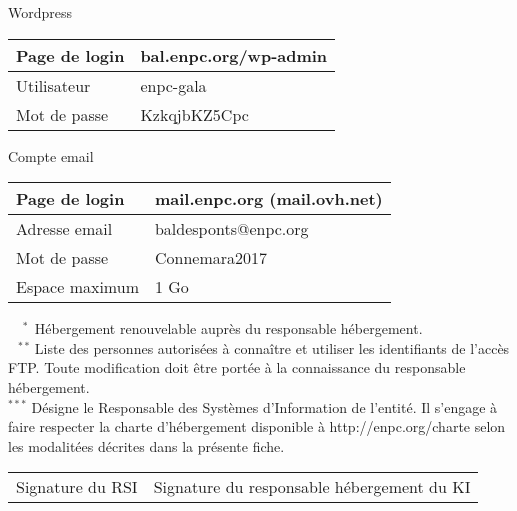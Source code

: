 \documentclass{ki019}
\newenvironment{tableau}[1]{
\LARGE #1\\
\vspace{0.4cm}
\begin{tabular}{|K{5cm}|K{10cm}|}
}
{
\end{tabular}
\vspace{0.5cm}
}
\begin{document}
\begin{center}
\begin{tableau}{Wordpress}
\hline
Page de login & bal.enpc.org/wp-admin \\
\hline
Utilisateur & enpc-gala \\
\hline
Mot de passe & KzkqjbKZ5Cpc \\
\hline
\end{tableau}

\begin{tableau}{Compte email}
\hline
Page de login & mail.enpc.org (mail.ovh.net) \\
\hline
Adresse email & baldesponts@enpc.org \\
\hline
Mot de passe & Connemara2017 \\
\hline
Espace maximum & 1 Go \\
\hline
\end{tableau}

\end{center}

\vspace{-0.5cm}
\noindent
$^{\phantom{**}*}$ Hébergement renouvelable auprès du responsable hébergement. \\
$^{\phantom{*}**}$ Liste des personnes autorisées à connaître et utiliser les identifiants de l'accès FTP. Toute modification doit être portée à la connaissance du responsable hébergement. \\
$^{***}$ Désigne le Responsable des Systèmes d'Information de l'entité. Il s'engage à faire respecter la charte d'hébergement disponible à http://enpc.org/charte selon les modalitées décrites dans la présente fiche.

\vspace{0.5cm}
\Large
\begin{tabular}{p{6cm}p{9.5cm}}
Signature du RSI & Signature du responsable hébergement du KI
\end{tabular}

\Footer{\today}
\end{document}
